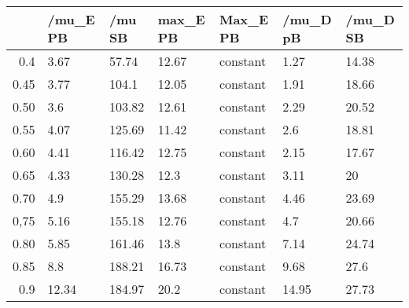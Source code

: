 \begin{table}[ht]
\centering
\begin{tabular}{rllllll}
  \hline
 & /mu\_E PB & /mu SB & max\_E PB & Max\_E PB & /mu\_D pB & /mu\_D SB \\ 
  \hline
0.4 & 3.67 & 57.74 & 12.67 & constant & 1.27 & 14.38 \\ 
  0.45 & 3.77 & 104.1 & 12.05 & constant & 1.91 & 18.66 \\ 
  0.50 & 3.6 & 103.82 & 12.61 & constant & 2.29 & 20.52 \\ 
  0.55 & 4.07 & 125.69 & 11.42 & constant & 2.6 & 18.81 \\ 
  0.60 & 4.41 & 116.42 & 12.75 & constant & 2.15 & 17.67 \\ 
  0.65 & 4.33 & 130.28 & 12.3 & constant & 3.11 & 20 \\ 
  0.70 & 4.9 & 155.29 & 13.68 & constant & 4.46 & 23.69 \\ 
  0,75 & 5.16 & 155.18 & 12.76 & constant & 4.7 & 20.66 \\ 
  0.80 & 5.85 & 161.46 & 13.8 & constant & 7.14 & 24.74 \\ 
  0.85 & 8.8 & 188.21 & 16.73 & constant & 9.68 & 27.6 \\ 
  0.9 & 12.34 & 184.97 & 20.2 & constant & 14.95 & 27.73 \\ 
   \hline
\end{tabular}
\end{table}
